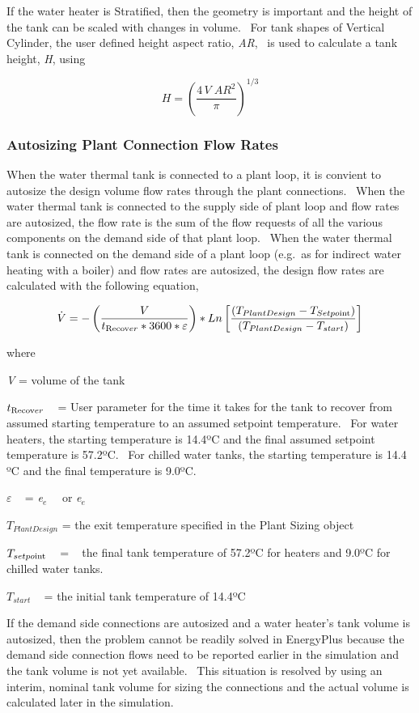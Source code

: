 If the water heater is Stratified, then the geometry is important and the height of the tank can be scaled with changes in volume.~ For tank shapes of Vertical Cylinder, the user defined height aspect ratio, \emph{AR},~ is used to calculate a tank height, \emph{H}, using

\begin{equation}
H = {\left( {\frac{{4\,V\;A{R^2}}}{\pi }} \right)^{1/3}}
\end{equation}

\subsubsection{Autosizing Plant Connection Flow Rates}\label{autosizing-plant-connection-flow-rates}

When the water thermal tank is connected to a plant loop, it is convient to autosize the design volume flow rates through the plant connections.~ When the water thermal tank is connected to the supply side of plant loop and flow rates are autosized, the flow rate is the sum of the flow requests of all the various components on the demand side of that plant loop.~ When the water thermal tank is connected on the demand side of a plant loop (e.g.~as for indirect water heating with a boiler) and flow rates are autosized, the design flow rates are calculated with the following equation,

\begin{equation}
\dot V =  - \left( {\frac{V}{{{t_{{\mathop{\rm Re}\nolimits} {\mathop{\rm cov}} er}} * 3600 * \varepsilon }}} \right) * Ln\left[ {\frac{{\left( {{T_{PlantDesign}} - {T_{Setpo{\mathop{\rm int}} }}} \right)}}{{\left( {{T_{PlantDesign}} - {T_{start}}} \right)}}} \right]
\end{equation}

where

\emph{V} = volume of the tank

\({t_{{\mathop{\rm Re}\nolimits} {\mathop{\rm cov}} er}}\) ~ = User parameter for the time it takes for the tank to recover from assumed starting temperature to an assumed setpoint temperature.~ For water heaters, the starting temperature is 14.4ºC and the final assumed setpoint temperature is 57.2ºC.~ For chilled water tanks, the starting temperature is 14.4 ºC and the final temperature is 9.0ºC.

\(\varepsilon\) ~ = \emph{e\(_{e}\)} ~~or \emph{e\(_{e}\)}

\({T_{PlantDesign}}\) = the exit temperature specified in the Plant Sizing object

\({T_{setpo{\mathop{\rm int}} }}\) ~ = ~ the final tank temperature of 57.2ºC for heaters and 9.0ºC for chilled water tanks.

\({T_{start}}\) ~ = the initial tank temperature of 14.4ºC

If the demand side connections are autosized and a water heater's tank volume is autosized, then the problem cannot be readily solved in EnergyPlus because the demand side connection flows need to be reported earlier in the simulation and the tank volume is not yet available.~ This situation is resolved by using an interim, nominal tank volume for sizing the connections and the actual volume is calculated later in the simulation.
